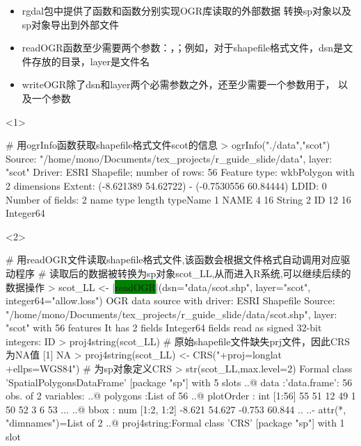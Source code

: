\begin{frame}[t,fragile]{\subsecname}{\subsubsecname}
\begin{itemize} 
\item<1-> rgdal包中提供了函数和函数分别实现OGR库读取的外部数据
转换sp对象以及sp对象导出到外部文件
\item<2-> readOGR函数至少需要两个参数：，；例如，对于shapefile格式文件，dsn是文件存放的目录，layer是文件名
\item<3-> writeOGR除了dsn和layer两个必需参数之外，还至少需要一个参数用于，
以及一个参数
\end{itemize}

\begin{overlayarea}{\textwidth}{\textheight}
\begin{onlyenv}<1>
\begin{rcode}
# 用ogrInfo函数获取shapefile格式文件scot的信息
> ogrInfo("./data","scot")
Source: "/home/mono/Documents/tex_projects/r_guide_slide/data", layer: "scot"
Driver: ESRI Shapefile; number of rows: 56 
Feature type: wkbPolygon with 2 dimensions
Extent: (-8.621389 54.62722) - (-0.7530556 60.84444)
LDID: 0 
Number of fields: 2 
  name type length  typeName
1 NAME    4     16    String
2   ID   12     16 Integer64
\end{rcode}
\end{onlyenv}

\begin{onlyenv}<2>
\begin{rcode}
# 用readOGR文件读取shapefile格式文件,该函数会根据文件格式自动调用对应驱动程序
# 读取后的数据被转换为sp对象scot\_LL,从而进入R系统,可以继续后续的数据操作
> scot_LL <- |\colorbox{green}{readOGR}|(dsn="data/scot.shp", layer="scot", integer64="allow.loss")
OGR data source with driver: ESRI Shapefile 
Source: "/home/mono/Documents/tex_projects/r_guide_slide/data/scot.shp", layer: "scot"
with 56 features
It has 2 fields
Integer64 fields read as signed 32-bit integers:  ID 
> proj4string(scot_LL) # 原始shapefile文件缺失prj文件，因此CRS为NA值
[1] NA
> proj4string(scot_LL) <- CRS("+proj=longlat +ellps=WGS84") # 为sp对象定义CRS
> str(scot_LL,max.level=2)
Formal class 'SpatialPolygonsDataFrame' [package "sp"] with 5 slots
  ..@ data       :'data.frame': 56 obs. of  2 variables:
  ..@ polygons   :List of 56
  ..@ plotOrder  : int [1:56] 55 51 12 49 1 50 52 3 6 53 ...
  ..@ bbox       : num [1:2, 1:2] -8.621 54.627 -0.753 60.844
  .. ..- attr(*, "dimnames")=List of 2
  ..@ proj4string:Formal class 'CRS' [package "sp"] with 1 slot
\end{rcode}
\end{onlyenv}


\end{overlayarea}
\end{frame}
